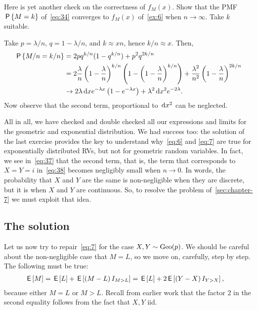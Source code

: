 \documentclass[a4paper,12pt]{article}
\begin{document}
\begin{exercise}
Here is yet another check on the correctness of $f_M(x)$. 
Show that  the PMF $\P{M=k}$ of~\cref{eq:34} converges to $f_M(x)$ of~\cref{ex:6} when $n\to \infty$. Take $k$ suitable.
\begin{solution} Take $p=\lambda/n$,  $q=1-\lambda/n$, and $k \approx x n$, hence $k/n \approx x$. Then,
  \begin{align}
    \label{eq:31}
\P{M/n=k/n}  
&= 2 p q^{k/n}(1-q^{k/n}) + p^2q^{2k/n} \\
&= 2 \frac \lambda n \left(1-\frac \lambda n\right)^{k/n}\left(1-\left(1-\frac \lambda n\right)^{k/n}\right) + \frac{\lambda^2}{n^2}\left(1-\frac \lambda n \right)^{2k/n} \\
&\to 2 \lambda \d x e^{-\lambda x} \left(1 - e^{-\lambda x}\right) + \lambda^{2} \d x^{2}e^{-2\lambda}.\label{eq:37}
  \end{align}
Now observe that the second term, proportional to $\d x^{2}$ can be neglected. 
\end{solution}
\end{exercise}

All in all, we have checked and double checked all our expressions and limits for the geometric and exponential distribution.
We had success too: the solution of the last exercise provides the key to understand why~\eqref{eq:6} and \eqref{eq:7} are true for exponentially distributed RVs, but not for geometric random variables.
In fact, we see in~\cref{eq:37} that the second term, that is, the term that corresponds to $X=Y=i$ in~\cref{eq:38} becomes negligibly small when $n\to 0$.
In words, the probability that $X$ and $Y$ are the same is non-negligible when they are discrete, but it is when $X$ and $Y$ are continuous. So, to resolve the problem of~\cref{sec:chapter-7} we must exploit that idea.

\subsection{The solution}
\label{sec:solution}


Let us now try to repair~\cref{eq:7}  for the case $X,Y\sim\Geo{p}$. We should be careful about the non-negligible case that $M=L$, so we move on, carefully, step by step. The following must be true:
\begin{align}
  \label{eq:40}
\E M &= \E L + \E{(M-L) \1{M>L}}  = \E L + 2\E{(Y-X) \1{Y>X}},
\end{align}
because either $M=L$ or $M>L$.
Recall from earlier work that the factor 2 in the second equality follows from the fact that $X,Y$ iid.
\end{document}
